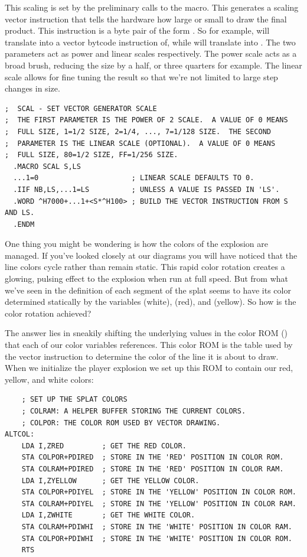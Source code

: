 \clearpage

This scaling is set by the preliminary calls to the  macro. This generates a scaling vector
instruction that tells the hardware how large or small to draw the final product. This instruction
is a byte pair of the form . So for example,  will translate into a vector
bytcode instruction of,
while  will translate into . The two parameters act as power and linear
scales respectively. The power scale acts as a broad brush, reducing the size by a half, or three quarters for example.
The linear scale allows for fine tuning the result so that we're not limited to large step changes in size.

\begin{lstlisting}
;  SCAL - SET VECTOR GENERATOR SCALE
;  THE FIRST PARAMETER IS THE POWER OF 2 SCALE.  A VALUE OF 0 MEANS
;  FULL SIZE, 1=1/2 SIZE, 2=1/4, ..., 7=1/128 SIZE.  THE SECOND
;  PARAMETER IS THE LINEAR SCALE (OPTIONAL).  A VALUE OF 0 MEANS
;  FULL SIZE, 80=1/2 SIZE, FF=1/256 SIZE.
  .MACRO SCAL S,LS
  ...1=0                      ; LINEAR SCALE DEFAULTS TO 0.
  .IIF NB,LS,...1=LS          ; UNLESS A VALUE IS PASSED IN 'LS'.
  .WORD ^H7000+...1+<S*^H100> ; BUILD THE VECTOR INSTRUCTION FROM S AND LS.
  .ENDM
\end{lstlisting}

One thing you might be wondering is how the colors of the explosion are managed. If you've looked closely
at our diagrams you will have noticed that the line colors cycle rather than remain static. This rapid
color rotation creates a glowing, pulsing effect to the explosion when run at full speed. But from what we've seen in the definition
of  each segment of the splat seems to have its color determined statically by the variables
 (white),  (red), and  (yellow). So how is the color rotation achieved?

The answer lies in sneakily shifting the underlying values in the color ROM () that each of our color variables references. 
This color ROM is the table used by the vector instruction to determine the color of the line it is about to draw. When
we initialize the player explosion we set up this ROM to contain our red, yellow, and white colors:
\begin{lstlisting}
    ; SET UP THE SPLAT COLORS
    ; COLRAM: A HELPER BUFFER STORING THE CURRENT COLORS.
    ; COLPOR: THE COLOR ROM USED BY VECTOR DRAWING.
ALTCOL: 
    LDA I,ZRED         ; GET THE RED COLOR.
    STA COLPOR+PDIRED  ; STORE IN THE 'RED' POSITION IN COLOR ROM.
    STA COLRAM+PDIRED  ; STORE IN THE 'RED' POSITION IN COLOR RAM.
    LDA I,ZYELLOW      ; GET THE YELLOW COLOR.
    STA COLPOR+PDIYEL  ; STORE IN THE 'YELLOW' POSITION IN COLOR ROM.
    STA COLRAM+PDIYEL  ; STORE IN THE 'YELLOW' POSITION IN COLOR RAM.
    LDA I,ZWHITE       ; GET THE WHITE COLOR.
    STA COLRAM+PDIWHI  ; STORE IN THE 'WHITE' POSITION IN COLOR RAM.
    STA COLPOR+PDIWHI  ; STORE IN THE 'WHITE' POSITION IN COLOR ROM.
    RTS
\end{lstlisting}

